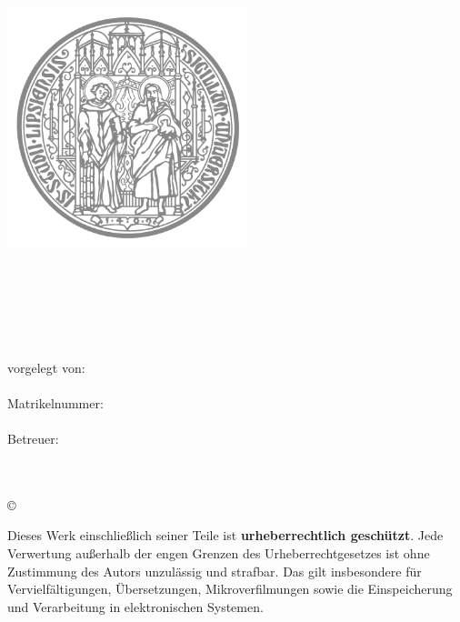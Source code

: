 \thispagestyle{plain}
\begin{titlepage}

\begin{center}
\includegraphics[height=7cm]{Bilder/Uni-L.png}\\[2.5ex]

\textsc{\hochschule}\\[1.2ex]
\institut\\
\fakultaet\\
\fachgebiet\\[6ex]

\textsc{\textbf{\large\titel}}\\[1.5ex]
\art\\[6ex]

\normalsize
vorgelegt von:\\
\autor\\[1.5ex]
Matrikelnummer:\\
\matrikelnr\\[1.5ex]
Betreuer:\\
\erstgutachter\\
\zweitgutachter\\[1.0ex]
\end{center}


\begin{center}
\copyright\ \jahr\\[1.0ex]
\end{center}

\singlespacing
\small
\noindent Dieses Werk einschließlich seiner Teile ist \textbf{urheberrechtlich geschützt}. Jede Verwertung außerhalb der engen Grenzen des Urheberrechtgesetzes ist ohne Zustimmung des Autors unzulässig und strafbar. Das gilt insbesondere für Vervielfältigungen, Übersetzungen, Mikroverfilmungen sowie die Einspeicherung und Verarbeitung in elektronischen Systemen.

\end{titlepage}
